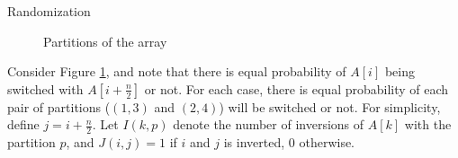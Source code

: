 \documentclass{article}
\begin{document}
\begin{section}{Randomization}
\begin{enumerate}
\begin{figure}[h]
        \caption{Partitions of the array}
        \label{fig:random1}
    \end{figure}
    
    Consider Figure \ref{fig:random1}, and note that there is equal probability of $A[i]$ being switched with $A[i + \frac{n}{2}]$ or not. For each case, there is equal probability of each pair of partitions ($(1,3)$ and $(2,4)$) will be switched or not. For simplicity, define $j = i + \frac{n}{2}$. Let $I(k, p)$ denote the number of inversions of $A[k]$ with the partition $p$, and $J(i, j) = 1$ if $i$ and $j$ is inverted, $0$ otherwise.
    

\end{enumerate}
\end{section}
\end{document}
